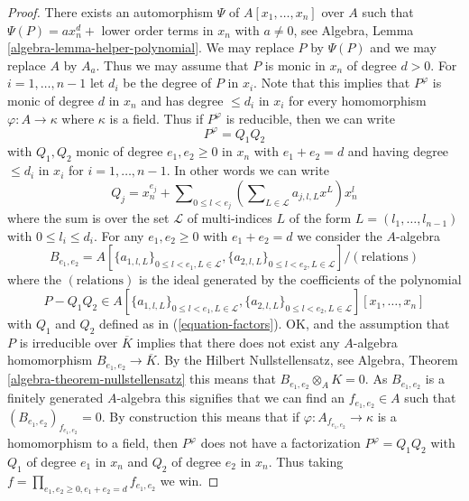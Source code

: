 \documentclass[10pt,a4paper]{amsart}
\theoremstyle{plain}
\theoremstyle{definition}
\theoremstyle{remark}
\numberwithin{equation}{subsection}
\begin{document}
\begin{proof}
There exists an automorphism $\Psi$ of $A[x_1, \ldots, x_n]$ over $A$
such that $\Psi(P) = ax_n^d +$ lower order terms in $x_n$ with
$a \not = 0$, see
Algebra, Lemma \ref{algebra-lemma-helper-polynomial}.
We may replace $P$ by $\Psi(P)$ and we may replace $A$ by $A_a$.
Thus we may assume that $P$ is monic in $x_n$ of degree $d > 0$.
For $i = 1, \ldots, n - 1$ let $d_i$ be the degree of $P$ in $x_i$.
Note that this implies that $P^\varphi$ is monic of degree $d$ in $x_n$
and has degree $\leq d_i$ in $x_i$ for every homomorphism
$\varphi : A \to \kappa$ where $\kappa$ is a field.
Thus if $P^\varphi$ is reducible, then we can write
$$
P^\varphi = Q_1 Q_2
$$
with $Q_1, Q_2$ monic of degree $e_1, e_2 \geq 0$ in $x_n$ with
$e_1 + e_2 = d$ and having degree $\leq d_i$ in $x_i$ for
$i = 1, \ldots, n - 1$. In other words we can write
\begin{equation}
\label{equation-factors}
Q_j = x_n^{e_j} + \sum\nolimits_{0 \leq l < e_j}
\left( \sum\nolimits_{L \in \mathcal{L}} a_{j, l, L} x^L \right) x_n^l
\end{equation}
where the sum is over the set $\mathcal{L}$ of multi-indices $L$
of the form $L = (l_1, \ldots, l_{n - 1})$ with $0 \leq l_i \leq d_i$.
For any $e_1, e_2 \geq 0$ with $e_1 + e_2 = d$ we consider the $A$-algebra
$$
B_{e_1, e_2} =
A[\{a_{1, l, L}\}_{0 \leq l < e_1, L \in \mathcal{L}},
\{a_{2, l, L}\}_{0 \leq l < e_2, L \in \mathcal{L}}]/(\text{relations})
$$
where the $(\text{relations})$ is the ideal generated by the coefficients
of the polynomial
$$
P - Q_1Q_2 \in
A[\{a_{1, l, L}\}_{0 \leq l < e_1, L \in \mathcal{L}},
\{a_{2, l, L}\}_{0 \leq l < e_2, L \in \mathcal{L}}][x_1, \ldots, x_n]
$$
with $Q_1$ and $Q_2$ defined as in (\ref{equation-factors}). OK, and
the assumption that $P$ is irreducible over $\overline{K}$ implies that
there does not exist any $A$-algebra homomorphism
$B_{e_1, e_2} \to \overline{K}$. By the Hilbert Nullstellensatz, see
Algebra, Theorem \ref{algebra-theorem-nullstellensatz}
this means that $B_{e_1, e_2} \otimes_A K = 0$.
As $B_{e_1, e_2}$ is a finitely generated $A$-algebra this signifies that
we can find an $f_{e_1, e_2} \in A$ such that
$(B_{e_1, e_2})_{f_{e_1, e_2}} = 0$. By construction this means that
if $\varphi : A_{f_{e_1, e_2}} \to \kappa$ is a homomorphism to a field,
then $P^\varphi$ does not have a factorization $P^\varphi = Q_1 Q_2$
with $Q_1$ of degree $e_1$ in $x_n$ and $Q_2$ of degree $e_2$ in $x_n$.
Thus taking
$f = \prod_{e_1, e_2 \geq 0, e_1 + e_2 = d} f_{e_1, e_2}$ we win.
\end{proof}
\end{document}
